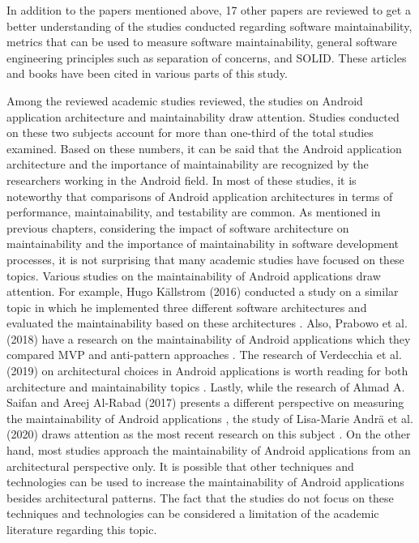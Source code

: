 In addition to the papers mentioned above, 17 other papers are reviewed to get a better understanding of the studies conducted regarding software maintainability, metrics that can be used to measure software maintainability, general software engineering principles such as separation of concerns, and SOLID. These articles and books have been cited in various parts of this study.

Among the reviewed academic studies reviewed, the studies on Android application architecture and maintainability draw attention. Studies conducted on these two subjects account for more than one-third of the total studies examined. Based on these numbers, it can be said that the Android application architecture and the importance of maintainability are recognized by the researchers working in the Android field. In most of these studies, it is noteworthy that comparisons of Android application architectures in terms of performance, maintainability, and testability are common. As mentioned in previous chapters, considering the impact of software architecture on maintainability and the importance of maintainability in software development processes, it is not surprising that many academic studies have focused on these topics. Various studies on the maintainability of Android applications draw attention. For example, Hugo Källstrom (2016) conducted a study on a similar topic in which he implemented three different software architectures and evaluated the maintainability based on these architectures \cite{18}. Also, Prabowo et al. (2018) have a research on the maintainability of Android applications which they compared MVP and anti-pattern approaches \cite{19}. The research of Verdecchia et al. (2019) on architectural choices in Android applications is worth reading for both architecture and maintainability topics \cite{14}. Lastly, while the research of Ahmad A. Saifan and Areej Al-Rabad (2017) presents a different perspective on measuring the maintainability of Android applications \cite{34}, the study of Lisa-Marie Andrä et al. (2020) draws attention as the most recent research on this subject \cite{43}. On the other hand, most studies approach the maintainability of Android applications from an architectural perspective only. It is possible that other techniques and technologies can be used to increase the maintainability of Android applications besides architectural patterns. The fact that the studies do not focus on these techniques and technologies can be considered a limitation of the academic literature regarding this topic.